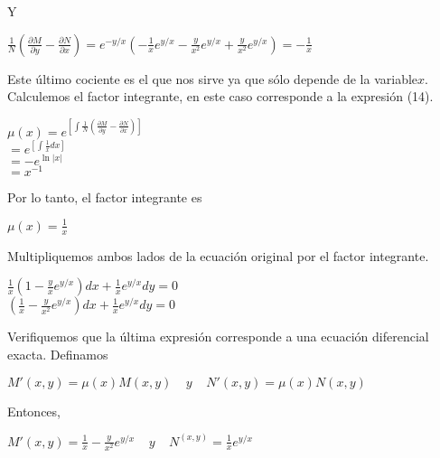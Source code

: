 \documentclass[l etterpaper,11pt]{article}
\begin{document}
Y
\begin{center}

$\frac{1}{N}\left(\frac{\partial M}{\partial y}-\frac{\partial N}{\partial x}\right)=e^{-y/x}\left(-\frac{1}{x}e^{y/x}-\frac{y}{x^2}e^{y/x}+\frac{y}{x^2}e^{y/x}\right)=-\frac{1}{x}$\\
\end{center}


Este último cociente es el que nos sirve ya que sólo depende de la variable$ x.$ Calculemos el factor integrante, en este caso corresponde a la expresión (14).
\begin{center}

$\mu\left(x\right)=e^{\left[\int{\frac{1}{N}\left(\frac{\partial M}{\partial y}-\frac{\partial N}{\partial x}\right)}\right]}$\\
$=e^{\left[\int{\frac{1}{x}dx}\right]}$\\

$=-e^{\ln{\left|x\right|}}$\\
$=x^{-1}$\\
\end{center}

Por lo tanto, el factor integrante es
\begin{center}

$\mu(x)=\frac{1}{x}$\\
\end{center}

Multipliquemos ambos lados de la ecuación original por el factor integrante.
\begin{center}

$\frac{1}{x}(1-\frac{y}{x}e^{y/x})dx+\frac{1}{x}e^{y/x}dy=0$\\
$(\frac{1}{x}-\frac{y}{x^2}e^{y/x})dx+\frac{1}{x}e^{y/x}dy=0$\\
\end{center}

Verifiquemos que la última expresión corresponde a una ecuación diferencial exacta. Definamos
\begin{center}

$M\prime(x,y)=\mu(x)M(x,y)\ \ \ \ \ y\ \ \ \ \ N\prime(x,y)=\mu(x)N(x,y) $\\
\end{center}

Entonces,
\begin{center}

$M\prime(x,y)=\frac{1}{x}-\frac{y}{x^2}e^{y/x}\ \ \ \ \ y\ \ \ \ \ N^(x,y)=\frac{1}{x}e^{y/x}$\\
\end{center}
\end{document}
